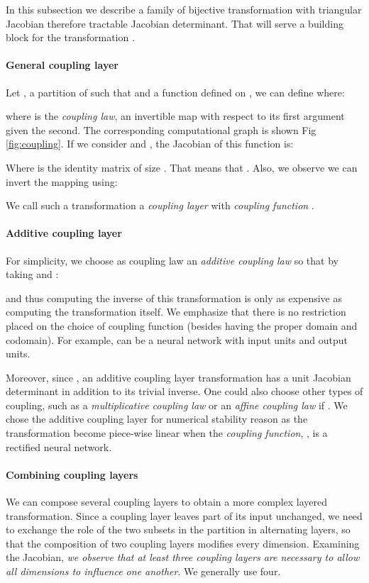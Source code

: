 \documentclass{article}
\begin{document}
In this subsection we describe a family of bijective transformation with triangular Jacobian therefore tractable Jacobian determinant. That will
serve a building block for the transformation .

\paragraph*{General coupling layer}
Let ,  a partition of 
such that  and  a function defined on
, we can define  where:

where
 is the \textit{coupling law},
an invertible map with respect to its first argument given the second. The
corresponding computational graph is shown Fig \ref{fig:coupling}. If we consider
 and ,
the Jacobian of this function is:

Where  is the identity matrix of size . That means that
. 
Also, we observe we can invert the mapping using:

We call such a transformation a \textit{coupling layer} with
\textit{coupling function} .  

\paragraph*{Additive coupling layer}
For simplicity, we choose as coupling law an
\textit{additive coupling law}  so that by taking
 and :

and thus computing the inverse of this
transformation is only as expensive as computing the transformation itself.
We emphasize that there is no restriction placed on the choice of coupling function  (besides having the proper domain and codomain).
For example,  can be a neural network with  input units and  output units.




Moreover, since , an 
additive coupling layer transformation has a unit Jacobian
determinant in addition to its trivial inverse. One could also
choose other types of coupling, such as a
\textit{multiplicative coupling law}  or an
\textit{affine coupling law}  if 
. We chose the
additive coupling layer for numerical stability reason as the transformation
become piece-wise linear when the {\em coupling function}, , is a rectified
neural network.


\paragraph*{Combining coupling layers}
We can compose several coupling layers to obtain a more complex
layered transformation.
Since a coupling layer leaves part of its input unchanged, we need to
exchange the role of
the two subsets in the partition in alternating layers, so that the composition of two coupling layers 
modifies every dimension. Examining the Jacobian, {\em we observe that at least three coupling
layers are necessary to allow all dimensions to influence one another}. We generally use four.
\end{document}
